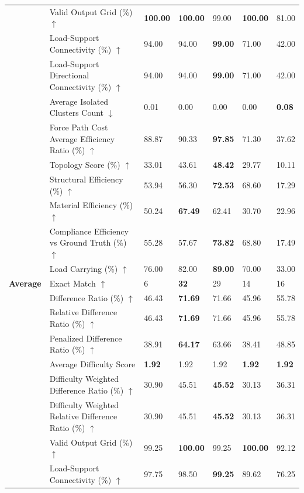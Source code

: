 \begin{table}[!h]
{\begin{tabular}{lllllll}
 & Valid Output Grid (\%) $\uparrow$ & \textbf{100.00} & \textbf{100.00} & 99.00 & \textbf{100.00} & 81.00 \\
 & Load-Support Connectivity (\%) $\uparrow$ & 94.00 & 94.00 & \textbf{99.00} & 71.00 & 42.00 \\
 & Load-Support Directional Connectivity (\%) $\uparrow$ & 94.00 & 94.00 & \textbf{99.00} & 71.00 & 42.00 \\
 & Average Isolated Clusters Count $\downarrow$ & 0.01 & 0.00 & 0.00 & 0.00 & \textbf{0.08} \\
 & Force Path Cost Average Efficiency Ratio (\%) $\uparrow$ & 88.87 & 90.33 & \textbf{97.85} & 71.30 & 37.62 \\
 & Topology Score (\%) $\uparrow$ & 33.01 & 43.61 & \textbf{48.42} & 29.77 & 10.11 \\
 & Structural Efficiency (\%) $\uparrow$ & 53.94 & 56.30 & \textbf{72.53} & 68.60 & 17.29 \\
 & Material Efficiency (\%) $\uparrow$ & 50.24 & \textbf{67.49} & 62.41 & 30.70 & 22.96 \\
 & Compliance Efficiency vs Ground Truth (\%) $\uparrow$ & 55.28 & 57.67 & \textbf{73.82} & 68.80 & 17.49 \\
 & Load Carrying (\%) $\uparrow$ & 76.00 & 82.00 & \textbf{89.00} & 70.00 & 33.00 \\
\midrule
\textbf{Average} & Exact Match $\uparrow$ & 6 & \textbf{32} & 29 & 14 & 16 \\
 & Difference Ratio (\%) $\uparrow$ & 46.43 & \textbf{71.69} & 71.66 & 45.96 & 55.78 \\
 & Relative Difference Ratio (\%) $\uparrow$ & 46.43 & \textbf{71.69} & 71.66 & 45.96 & 55.78 \\
 & Penalized Difference Ratio (\%) $\uparrow$ & 38.91 & \textbf{64.17} & 63.66 & 38.41 & 48.85 \\
 & Average Difficulty Score & \textbf{1.92} & 1.92 & 1.92 & \textbf{1.92} & \textbf{1.92} \\
 & Difficulty Weighted Difference Ratio (\%) $\uparrow$ & 30.90 & 45.51 & \textbf{45.52} & 30.13 & 36.31 \\
 & Difficulty Weighted Relative Difference Ratio (\%) $\uparrow$ & 30.90 & 45.51 & \textbf{45.52} & 30.13 & 36.31 \\
 & Valid Output Grid (\%) $\uparrow$ & 99.25 & \textbf{100.00} & 99.25 & \textbf{100.00} & 92.12 \\
 & Load-Support Connectivity (\%) $\uparrow$ & 97.75 & 98.50 & \textbf{99.25} & 89.62 & 76.25 \\

\end{tabular}}
\end{table}
